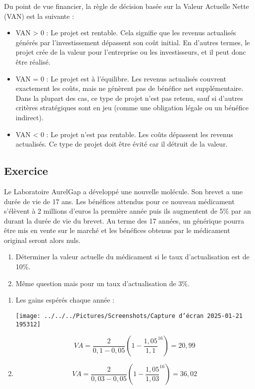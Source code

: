 \documentclass[a4paper, 12pt]{report}
\begin{document}
Du point de vue financier, la règle de décision basée sur la Valeur Actuelle Nette (VAN) est la suivante :

\begin{itemize}
	\item VAN > 0 : Le projet est rentable. Cela signifie que les revenus actualisés générés par l'investissement dépassent son coût initial. En d'autres termes, le projet crée de la valeur pour l'entreprise ou les investisseurs, et il peut donc être réalisé.
	\item VAN = 0 : Le projet est à l'équilibre. Les revenus actualisés couvrent exactement les coûts, mais ne génèrent pas de bénéfice net supplémentaire. Dans la plupart des cas, ce type de projet n'est pas retenu, sauf si d'autres critères stratégiques sont en jeu (comme une obligation légale ou un bénéfice indirect).
	\item VAN < 0 : Le projet n'est pas rentable. Les coûts dépassent les revenus actualisés. Ce type de projet doit être évité car il détruit de la valeur.
\end{itemize}


\subsection{Exercice}

Le Laboratoire AurelGap a développé une nouvelle molécule. Son brevet a une durée de vie de 17 ans. Les bénéfices attendus pour ce nouveau médicament s’élèvent à 2 millions d’euros la première année puis ils augmentent de 5\% par an durant la durée de vie du brevet. Au terme des 17 années, un générique pourra être mis en vente sur le marché et les bénéfices obtenus par le médicament original seront alors nuls.

\begin{enumerate}
	\item Déterminer la valeur actuelle du médicament si le taux d’actualisation est de 10\%.
	\item Même question mais pour un taux d’actualisation de 3\%.
\end{enumerate}

\begin{enumerate}
	\item Les gains espérés chaque année : 
	
\texttt{[image: ../../../Pictures/Screenshots/Capture d'écran 2025-01-21 195312]}

\[ VA = \frac{2}{0,1-0,05}\left( 1 - \frac{1,05}{1,1}^{16}\right)=20,99  \]

\item \[ VA = \frac{2}{0,03-0,05}\left( 1 - \frac{1,05}{1,03}^{16}\right)=36,02  \]

\end{enumerate}
\end{document}
